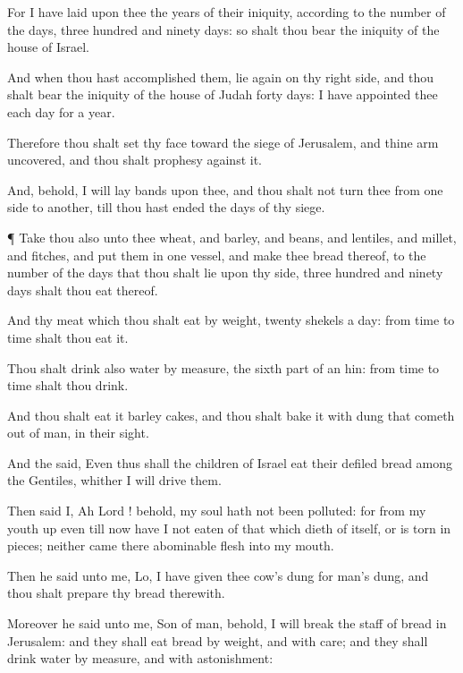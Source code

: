 {For I have
laid upon thee the
years of their
iniquity, according to the
number of the
days,
three
hundred and
ninety
days: so shalt thou
bear the
iniquity of the
house of
Israel.

And when thou hast
accomplished
them,
lie
again on thy
right
side, and thou shalt
bear the
iniquity of the
house of
Judah
forty
days: I have
appointed thee each
day for a
year.

Therefore thou shalt
set thy
face toward the
siege of
Jerusalem, and thine
arm
{}
uncovered, and thou shalt
prophesy against it.

And, behold, I will
lay
bands upon thee, and thou shalt not
turn thee from one
side to
another, till thou hast
ended the
days of thy
siege.


\par }{\PP {}¶
Take thou also unto thee
wheat, and
barley, and
beans, and
lentiles, and
millet, and
fitches, and
put them in
one
vessel, and
make thee
bread thereof,
{} to the
number of the
days that thou shalt
lie upon thy
side,
three
hundred and
ninety
days shalt thou
eat thereof.

And thy
meat which thou shalt
eat
{} by
weight,
twenty
shekels a
day: from
time to
time shalt thou
eat it.

Thou shalt
drink also
water by
measure, the sixth
part of an
hin: from
time to
time shalt thou
drink.

And thou shalt
eat it
{}
barley
cakes, and thou shalt
bake it with
dung that cometh
out of
man, in their
sight.

And the
{}
said, Even thus shall the
children of
Israel
eat their
defiled
bread among the
Gentiles, whither I will
drive them.

Then
said I,
Ah
Lord
{}! behold, my
soul hath not been
polluted: for from my
youth up even till now have I not
eaten of that which dieth of
itself, or is torn in
pieces; neither
came there
abominable
flesh into my
mouth.

Then he
said unto me,
Lo, I have
given thee
cow’s
dung for
man’s
dung, and thou shalt
prepare thy
bread therewith.

Moreover he
said unto me,
Son of
man, behold, I will
break the
staff of
bread in
Jerusalem: and they shall
eat
bread by
weight, and with
care; and they shall
drink
water by
measure, and with
astonishment:

}
